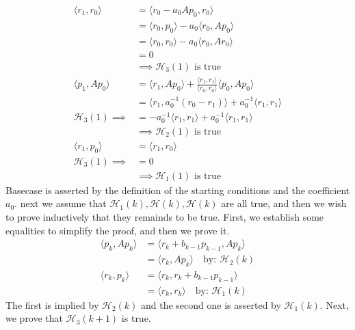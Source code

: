 \documentclass[]{article}
\begin{document}
    \begin{align*}\tag{1.2}\label{eqn:1.2}
        \langle r_1, r_0\rangle &= 
        \langle r_0 - a_0Ap_0, r_0\rangle
        \\
        &= 
        \langle 
            r_0, p_0
        \rangle - a_0\langle r_0, Ap_0\rangle
        \\
        &= 
        \langle 
            r_0, r_0
        \rangle - a_0\langle r_0, Ar_0\rangle
        \\
        &= 
        0
        \\
        & \implies \mathcal{H}_3(1) \text{ is true}
        \\
        \langle p_1, Ap_0\rangle &= 
        \langle r_1, Ap_0\rangle + \frac{\langle r_1, r_1\rangle}{\langle r_0, r_0\rangle} \langle p_0, Ap_0\rangle
        \\
        &= \langle r_1, a_0^{-1}(r_0 - r_1)\rangle
        + a_0^{-1}\langle r_1, r_1\rangle
        \\
        \mathcal{H}_3(1)\implies &= -a_0^{-1}\langle r_1, r_1\rangle + a_{0}^{-1}\langle r_1, r_1\rangle
        \\
        & \implies  \mathcal{H}_2(1) \text{ is true}
        \\
        \langle r_1, p_0\rangle &= \langle r_1, r_0\rangle
        \\
        \mathcal{H}_3(1)\implies &= 0
        \\
        & \implies \mathcal{H}_1(1) \text{ is true}
    \end{align*}
    Basecase is asserted by the definition of the starting conditions and the coefficient $a_0$. next we assume that $\mathcal{H}_1(k), \mathcal{H}(k), \mathcal{H}(k)$ are all true, and then we wish to prove inductively that they remainds to be true. First, we establish some equalities to simplify the proof, and then we prove it. 
    \begin{align*}\tag{1.3}\label{eqn:1.3}
        \langle p_k, Ap_k\rangle &= 
        \langle r_k + b_{k - 1}p_{k - 1}, Ap_k\rangle 
        \\
        &= \langle r_k, Ap_k\rangle \quad \text{by: } \mathcal{H}_2(k)
        \\
        \langle r_k, p_k\rangle &= 
        \langle r_k, r_k + b_{k - 1}p_{k - 1}\rangle 
        \\
        &= \langle r_k, r_k\rangle \quad \text{by: }\mathcal{H}_1(k)
    \end{align*}
    The first is implied by $\mathcal{H}_2(k)$ and the second one is asserted by $\mathcal{H}_1(k)$. Next, we prove that $\mathcal{H}_3{(k + 1)}$ is true. 
\end{document}
